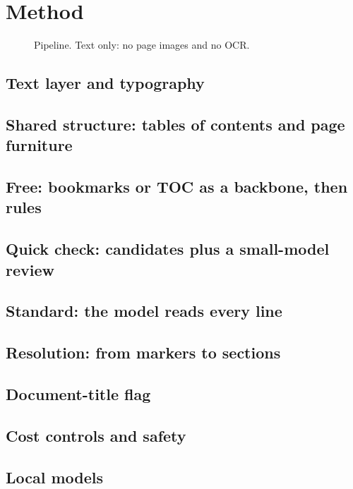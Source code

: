 \section{Method}
\label{sec:method}
\begin{figure}[t]
  \centering
  \caption{Pipeline. Text only: no page images and no OCR.}
  \label{fig:pipeline}
\end{figure}
\subsection{Text layer and typography}\label{sec:text-layer}
\subsection{Shared structure: tables of contents and page furniture}\label{sec:structure}
\subsection{Free: bookmarks or TOC as a backbone, then rules}\label{sec:free}
\subsection{Quick check: candidates plus a small-model review}\label{sec:quick}
\subsection{Standard: the model reads every line}\label{sec:standard}
\subsection{Resolution: from markers to sections}\label{sec:resolution}
\subsection{Document-title flag}\label{sec:doctitle}
\subsection{Cost controls and safety}\label{sec:cost-controls}
\subsection{Local models}\label{sec:local}
